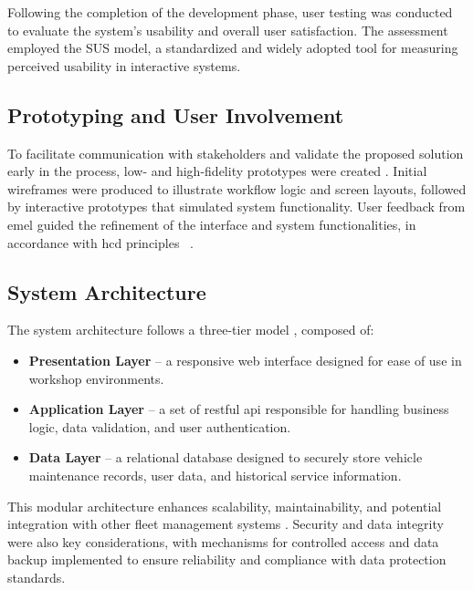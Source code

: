 Following the completion of the development phase, user testing was conducted to evaluate the system’s usability and overall user satisfaction. The assessment employed the \acs{SUS} model, a standardized and widely adopted tool for measuring perceived usability in interactive systems\cite{sus_ori, sus_proves, Bangor_Kortum_Miller_2008}.


\subsection{Prototyping and User Involvement}
\label{subsec:prototyping}

To facilitate communication with stakeholders and validate the proposed solution early in the process, low- and high-fidelity prototypes were created \cite{Dam_Siang_2025, GeeksforGeeks_2025}. Initial wireframes were produced to illustrate workflow logic and screen layouts, followed by interactive prototypes that simulated system functionality. User feedback from \acs{emel} guided the refinement of the interface and system functionalities, in accordance with \acs{hcd} principles ~\cite{ISO_9241_210_2019}.

\subsection{System Architecture}
\label{subsec:architecture}
 
The system architecture follows a three-tier model \cite{Ibm_2025, Chiaramonte_2025}, composed of:

\begin{itemize}
    \item \textbf{Presentation Layer} – a responsive web interface designed for ease of use in workshop environments.
    \item \textbf{Application Layer} – a set of \acs{rest}ful \acs{api} responsible for handling business logic, data validation, and user authentication.
    \item \textbf{Data Layer} – a relational database designed to securely store vehicle maintenance records, user data, and historical service information.
\end{itemize}

This modular architecture enhances scalability, maintainability, and potential integration with other fleet management systems \cite{Academia_2017, Ibm_2025}.  Security and data integrity were also key considerations, with mechanisms for controlled access and data backup implemented to ensure reliability and compliance with data protection standards.




